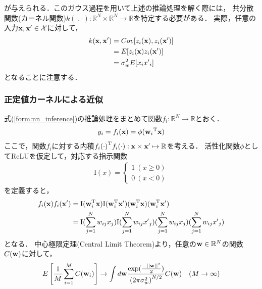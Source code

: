 \documentclass[11pt,a4j]{article}
\begin{document}
        が与えられる．このガウス過程を用いて上述の推論処理を解く際には，
        共分散関数(カーネル関数)$k(\cdot,\cdot): \mathbb{R}^{N} \times \mathbb{R}^{N} \to \mathbb{R}$を特定する必要がある．
        実際，任意の入力${\bf x}, {\bf x}' \in \mathcal{X}$に対して，
        \begin{align}
          k( {\bf x}, {\bf x}' ) 
          &= Cov[z_i({\bf x}), z_i({\bf x}')] \\ 
          &= E[z_i({\bf x}) z_i({\bf x}')] \\
          &= \sigma_w^2 E[ x_i {x'}_i ] 
        \end{align}
        となることに注意する．

      \subsubsection{正定値カーネルによる近似}
        式(\ref{form:nn_inference})の推論処理をまとめて関数$f_i:\mathbb{R}^{N} \to \mathbb{R}$とおく．
        \begin{align}
          y_i = f_i({\bf x}) = \phi( {{\bf w}_i}^{\mathrm{T}} {\bf x} )
        \end{align}
        ここで，関数$f_i$に対する内積${f_i(\cdot)}^{\mathrm{T}} f_i(\cdot): {\bf x} \times {\bf x}' \mapsto \mathbb{R}$を考える．
        活性化関数$\phi$としてReLUを仮定して，対応する指示関数
        \begin{align}
          {\mathrm{I}}(x) = 
          \begin{cases}
            1 ~ (x \geq 0) \\
            0 ~ (x < 0)
          \end{cases}
        \end{align}
        を定義すると，
        \begin{align}
          {f_i({\bf x})} f_i({\bf x}') 
          &= {\mathrm{I}}( {\bf w}_{i}^{\mathrm{T}} {\bf x} ) {\mathrm{I}}( {\bf w}_{i}^{\mathrm{T}} {\bf x}' ) 
          ( {\bf w}_{i}^{\mathrm{T}} {\bf x} ) ( {\bf w}_{i}^{\mathrm{T}} {\bf x}' ) \\
          &= {\mathrm{I}}(\sum_{j=1}^{N} {w}_{ij} {x}_j) {\mathrm{I}}(\sum_{j=1}^{N} {w}_{ij} {x'}_j)
          ( \sum_{j=1}^{N} {w}_{ij} {x}_j ) ( \sum_{j=1}^{N} {w}_{ij} {x'}_j )          
        \end{align}
        となる．
        中心極限定理(Central Limit Theorem)より，任意の${\bf w} \in \mathbb{R}^{N}$の関数$C({\bf w})$に対して，
        \begin{align}
          E\left[ \frac{1}{M} \sum_{i=1}^{M} C({\bf w}_i) \right] \to
          \int d{\bf w} \frac{\exp (\frac{- {|| {\bf w} ||}^2}{2})}{{(2 \pi \sigma_w^2 )}^{N / 2}}
          C({\bf w}) ~~~ (M \to \infty)
        \end{align}
\end{document}

